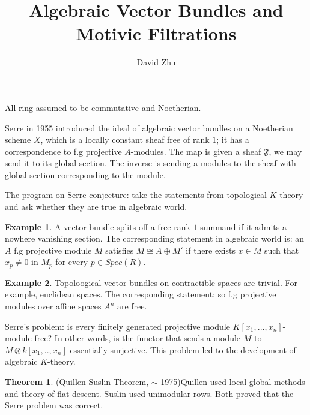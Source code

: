 \documentclass{article}
\title{Algebraic Vector Bundles and Motivic Filtrations}
\author{David Zhu}
\theoremstyle{definition}
\newtheorem{theorem}{Theorem}[section]
\theoremstyle{definition}
\theoremstyle{definition}
\theoremstyle{definition}
\theoremstyle{definition}
\theoremstyle{definition}
\theoremstyle{definition}
\newtheorem{example}{Example}[theorem]
\begin{document}
\maketitle

All ring assumed to be commutative and Noetherian. 

Serre in 1955 introduced the ideal of algebraic vector bundles on a Noetherian scheme $X$, which is a locally constant sheaf free of rank $1$; it has a correspondence to f.g projective $A$-modules. The map is given a sheaf $\mathfrak{F}$, we may send it to its global section. The inverse is sending a modules to the sheaf with global section corresponding to the module.

The program on Serre conjecture: take the statements from topological $K$-theory and ask whether they are true in algebraic world. 



\begin{tcolorbox}[colback=yellow!5!white,colframe=yellow!30!white]
\begin{example}
A vector bundle splits off a free rank $1$ summand if it admits a nowhere vanishing section. The corresponding statement in algebraic world is: an $A$ f.g projective module $M$ satisfies $M\cong A\oplus M'$ if there exists $x\in M$ such that $x_p\neq 0$ in $M_p$ for every $p\in Spec(R)$.  
\end{example}
\end{tcolorbox}


\begin{tcolorbox}[colback=yellow!5!white,colframe=yellow!30!white]
\begin{example}
    Topoloogical vector bundles on contractible spaces are trivial. For example, euclidean spaces. The corresponding statement: so f.g projective modules over affine spaces $A^n$ are free.
\end{example}
\end{tcolorbox} 

Serre's problem: is every finitely generated projective module $K[x_1,...,x_n]$-module free? In other words, is the functor that sends a module $M$ to $M\otimes k[x_1,..,x_n]$ essentially surjective. This problem led to the development of algebraic $K$-theory. 


\begin{tcolorbox}[colback=red!5!white,colframe=red!30!white]
\begin{theorem}
(Quillen-Suslin Theorem, $\sim$ 1975)Quillen used local-global methods and theory of flat descent. Suslin used unimodular rows. Both proved that the Serre problem was correct. 
\end{theorem}
\end{tcolorbox}
\end{document}

